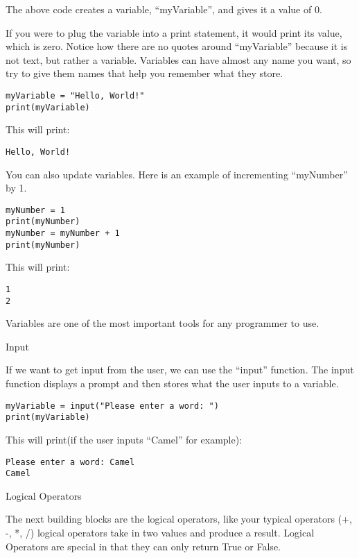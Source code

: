 \documentclass[12pt,oneside]{article}
\newcommand{\q}[1]{``#1''}
\newcommand{\subsectitle}[1]{
  \begin{flushleft}{\large#1}\end{flushleft}
}
\begin{document}
The above code creates a variable, \q{myVariable}, and gives it a value of 0. 

If you were to plug the variable into a print statement, it would print its value, which is zero. Notice how there are no quotes around \q{myVariable} because it is not text, but rather a variable. Variables can have almost any name you want, so try to give them names that help you remember what they store.

\begin{lstlisting}
myVariable = "Hello, World!"
print(myVariable)
\end{lstlisting}

This will print:

\begin{lstlisting}
Hello, World!
\end{lstlisting}

You can also update variables. Here is an example of incrementing \q{myNumber} by 1.

\begin{lstlisting}
myNumber = 1
print(myNumber)
myNumber = myNumber + 1
print(myNumber)
\end{lstlisting}

This will print:

\begin{lstlisting}
1
2
\end{lstlisting}

Variables are one of the most important tools for any programmer to use.

\subsectitle{Input}

If we want to get input from the user, we can use the \q{input} function. The input function displays a prompt and then stores what the user inputs to a variable.

\begin{lstlisting}
myVariable = input("Please enter a word: ")
print(myVariable)
\end{lstlisting}

This will print(if the user inputs \q{Camel} for example): 

\begin{lstlisting}
Please enter a word: Camel
Camel
\end{lstlisting}

\subsectitle{Logical Operators}

The next building blocks are the logical operators, like your typical operators (+, -, *, /) logical operators take in two values and produce a result. Logical Operators are special in that they can only return True or False. 
\end{document}

